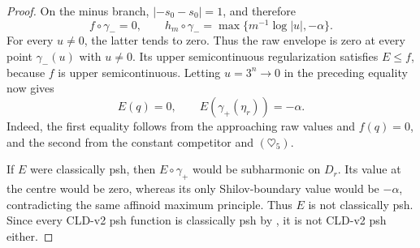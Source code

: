 \begin{proof}
On the minus branch, \(|-s_0-s_0|=1\), and therefore
\[
 f\circ\gamma_-=0,
 \qquad
 h_m\circ\gamma_-=
 \max\{m^{-1}\log|u|,-\alpha\}.
 \tag{\(\heartsuit_6\)}
\]
For every \(u\ne0\), the latter tends to zero.  Thus the raw envelope is
zero at every point \(\gamma_-(u)\) with \(u\ne0\).  Its upper
semicontinuous regularization satisfies \(E\leq f\), because \(f\) is
upper semicontinuous.  Letting \(u=3^n\to0\) in the preceding equality now
gives
\[
 E(q)=0,
 \qquad E(\gamma_+(\eta_r))=-\alpha.
 \tag{\(\heartsuit_7\)}
\]
Indeed, the first equality follows from the approaching raw values and
\(f(q)=0\), and the second from the constant competitor and
\((\heartsuit_5)\).

If \(E\) were classically psh, then \(E\circ\gamma_+\) would be
subharmonic on \(D_r\).  Its value at the centre would be zero, whereas its
only Shilov-boundary value would be \(-\alpha\), contradicting the same
affinoid maximum principle.  Thus \(E\) is not classically psh.  Since every
CLD-v2 psh function is classically psh by , it
is not CLD-v2 psh either.
\end{proof}
